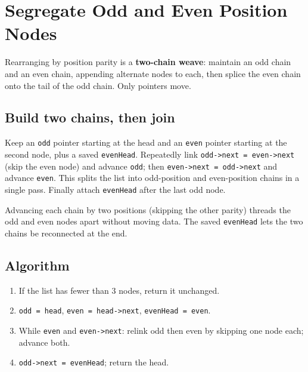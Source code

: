 \section{Segregate Odd and Even Position Nodes}
\label{sec:ll-odd-even}


\begin{patternbox}
Rearranging by position parity is a \textbf{two-chain weave}: maintain an
odd chain and an even chain, appending alternate nodes to each, then splice
the even chain onto the tail of the odd chain. Only pointers move.
\end{patternbox}

\subsection*{Build two chains, then join}

Keep an \texttt{odd} pointer starting at the head and an \texttt{even}
pointer starting at the second node, plus a saved \texttt{evenHead}. Repeatedly
link \texttt{odd->next = even->next} (skip the even node) and advance
\texttt{odd}; then \texttt{even->next = odd->next} and advance
\texttt{even}. This splits the list into odd-position and even-position
chains in a single pass. Finally attach \texttt{evenHead} after the last odd
node.

\begin{ideabox}
Advancing each chain by two positions (skipping the other parity) threads
the odd and even nodes apart without moving data. The saved
\texttt{evenHead} lets the two chains be reconnected at the end.
\end{ideabox}

\subsection*{Algorithm}

\begin{enumerate}
  \item If the list has fewer than $3$ nodes, return it unchanged.
  \item \texttt{odd = head}, \texttt{even = head->next},
        \texttt{evenHead = even}.
  \item While \texttt{even} and \texttt{even->next}: relink odd then even by
        skipping one node each; advance both.
  \item \texttt{odd->next = evenHead}; return the head.
\end{enumerate}

